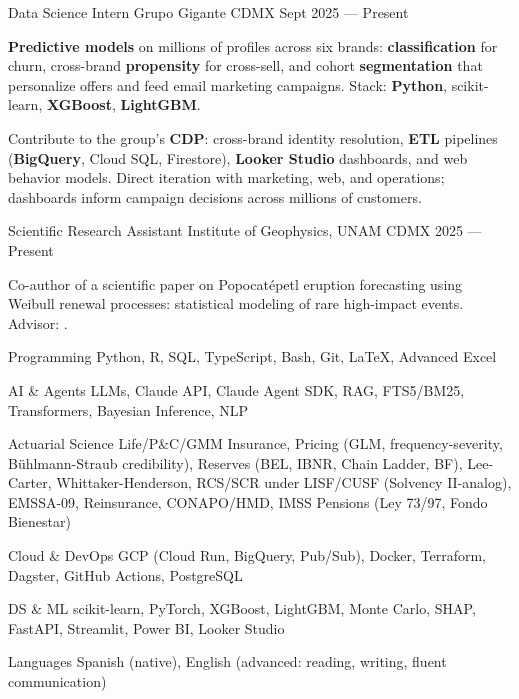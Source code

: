\documentclass[10pt, letterpaper]{awesome-cv}
\begin{document}
\begin{cventries}

  \cventry
    {Data Science Intern}
    {Grupo Gigante}
    {CDMX}
    {Sept 2025 — Present}
    {
      \begin{cvitems}
        \item {\textbf{Predictive models} on millions of profiles across six brands: \textbf{classification} for churn, cross-brand \textbf{propensity} for cross-sell, and cohort \textbf{segmentation} that personalize offers and feed email marketing campaigns. Stack: \textbf{Python}, scikit-learn, \textbf{XGBoost}, \textbf{LightGBM}.}
        \item {Contribute to the group's \textbf{CDP}: cross-brand identity resolution, \textbf{ETL} pipelines (\textbf{BigQuery}, Cloud SQL, Firestore), \textbf{Looker Studio} dashboards, and web behavior models. Direct iteration with marketing, web, and operations; dashboards inform campaign decisions across millions of customers.}
      \end{cvitems}
    }

  \cventry
    {Scientific Research Assistant }
    {Institute of Geophysics, UNAM}
    {CDMX}
    {2025 — Present}
    {
      \begin{cvitems}
        \item {Co-author of a scientific paper on Popocatépetl eruption forecasting using Weibull renewal processes: statistical modeling of rare high-impact events. Advisor: .}
      \end{cvitems}
    }

\end{cventries}


\begin{cvskills}
  \cvskill
    {Programming}
    {Python, R, SQL, TypeScript, Bash, Git, \LaTeX, Advanced Excel}

  \cvskill
    {AI \& Agents}
    {LLMs, Claude API, Claude Agent SDK, RAG, FTS5/BM25, Transformers, Bayesian Inference, NLP}

  \cvskill
    {Actuarial Science}
    {Life/P\&C/GMM Insurance, Pricing (GLM, frequency-severity, Bühlmann-Straub credibility), Reserves (BEL, IBNR, Chain Ladder, BF), Lee-Carter, Whittaker-Henderson, RCS/SCR under LISF/CUSF (Solvency II-analog), EMSSA-09, Reinsurance, CONAPO/HMD, IMSS Pensions (Ley 73/97, Fondo Bienestar)}

  \cvskill
    {Cloud \& DevOps}
    {GCP (Cloud Run, BigQuery, Pub/Sub), Docker, Terraform, Dagster, GitHub Actions, PostgreSQL}

  \cvskill
    {DS \& ML}
    {scikit-learn, PyTorch, XGBoost, LightGBM, Monte Carlo, SHAP, FastAPI, Streamlit, Power BI, Looker Studio}

  \cvskill
    {Languages}
    {Spanish (native), English (advanced: reading, writing, fluent communication)}
\end{cvskills}
\end{document}
